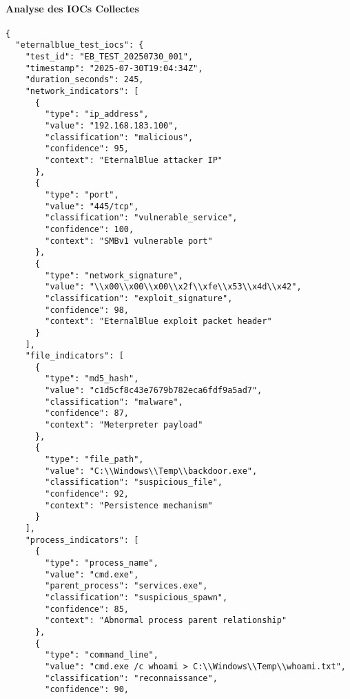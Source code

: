 \paragraph{Analyse des IOCs Collectes}

\begin{lstlisting}[style=jsonstyle,caption=IOCs extraits du test EternalBlue]
{
  "eternalblue_test_iocs": {
    "test_id": "EB_TEST_20250730_001",
    "timestamp": "2025-07-30T19:04:34Z",
    "duration_seconds": 245,
    "network_indicators": [
      {
        "type": "ip_address",
        "value": "192.168.183.100",
        "classification": "malicious",
        "confidence": 95,
        "context": "EternalBlue attacker IP"
      },
      {
        "type": "port",
        "value": "445/tcp",
        "classification": "vulnerable_service",
        "confidence": 100,
        "context": "SMBv1 vulnerable port"
      },
      {
        "type": "network_signature",
        "value": "\\x00\\x00\\x00\\x2f\\xfe\\x53\\x4d\\x42",
        "classification": "exploit_signature",
        "confidence": 98,
        "context": "EternalBlue exploit packet header"
      }
    ],
    "file_indicators": [
      {
        "type": "md5_hash",
        "value": "c1d5cf8c43e7679b782eca6fdf9a5ad7",
        "classification": "malware",
        "confidence": 87,
        "context": "Meterpreter payload"
      },
      {
        "type": "file_path",
        "value": "C:\\Windows\\Temp\\backdoor.exe",
        "classification": "suspicious_file",
        "confidence": 92,
        "context": "Persistence mechanism"
      }
    ],
    "process_indicators": [
      {
        "type": "process_name",
        "value": "cmd.exe",
        "parent_process": "services.exe",
        "classification": "suspicious_spawn",
        "confidence": 85,
        "context": "Abnormal process parent relationship"
      },
      {
        "type": "command_line",
        "value": "cmd.exe /c whoami > C:\\Windows\\Temp\\whoami.txt",
        "classification": "reconnaissance",
        "confidence": 90,

\end{lstlisting}
